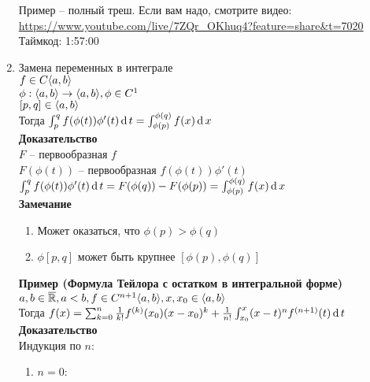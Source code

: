 \documentclass[12pt]{article}
\begin{document}
\begin{enumerate}
    Пример -- полный треш. Если вам надо, смотрите видео:\\
    \url{https://www.youtube.com/live/7ZQr_OKhuq4?feature=share&t=7020}\\
    Таймкод: 1:57:00
    \item Замена переменных в интеграле\\
    $f \in C\langle a, b \rangle$\\
    $\phi: \langle a, b \rangle \rightarrow \langle a, b \rangle, \phi \in C^1$\\
    $[p,q] \in \langle a, b \rangle$\\
    Тогда $\int_p^q f(\phi(t))\phi'(t)\operatorname{d} t = \int_{\phi(p)}^{\phi(q)} f(x)\operatorname{d} x$\\
    \textbf{Доказательство}\\
    $F$ -- первообразная $f$\\
    $F(\phi(t))$ -- первообразная $f(\phi(t))\phi'(t)$\\
    $\int_p^q f(\phi(t))\phi'(t)\operatorname{d} t = F(\phi(q)) - F(\phi(p)) = \int_{\phi(p)}^{\phi(q)} f(x)\operatorname{d} x$\\
    \textbf{Замечание}
    \begin{enumerate}
        \item Может оказаться, что $\phi(p) > \phi(q)$
        \item $\phi[p,q]$ может быть крупнее $[\phi(p), \phi(q)]$
    \end{enumerate}
    \textbf{Пример (Формула Тейлора с остатком в интегральной форме)}\\
    $a,b \in \overline{\mathbb{R}}, a < b, f \in C^{n+1}\langle a, b \rangle, x, x_0 \in \langle a, b \rangle$\\
    Тогда $f(x) = \sum_{k=0}^n \frac1{k!}f^{(k)}(x_0)(x-x_0)^k + \frac1{n!}\int_{x_0}^x (x-t)^n f^{(n+1)}(t)\operatorname{d} t$\\
    \textbf{Доказательство}\\
    Индукция по $n$:\\
    \begin{enumerate}
        \item $n = 0$:\\

\end{enumerate}
\end{enumerate}
\end{document}
